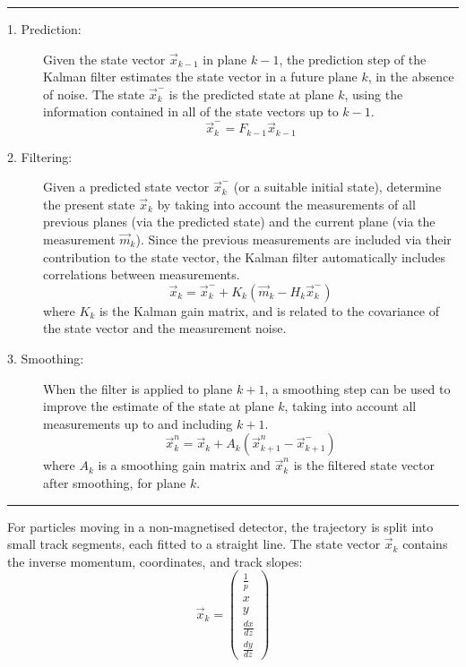 \vspace{1em}\hrule\vspace{1em}
\begin{description}
    \item[1. Prediction:] Given the state vector $\vec{x}_{k-1}$ in plane $k-1$, the prediction step of the Kalman filter estimates the state vector in a future plane $k$, in the absence of noise. The state $\vec{x}_k^{-}$ is the predicted state at plane $k$, using the information contained in all of the state vectors up to $k-1$.
    \begin{equation}\label{eqn:kalman_prediction_step}
        \vec{x}_k^{-} = F_{k-1} \vec{x}_{k-1}
    \end{equation}

    \item[2. Filtering:] Given a predicted state vector $\vec{x}_k^{-}$ (or a suitable initial state), determine the present state $\vec{x}_k$ by taking into account the measurements of all previous planes (via the predicted state) and the current plane (via the measurement $\vec{m}_k$). Since the previous measurements are included via their contribution to the state vector, the Kalman filter automatically includes correlations between measurements.
    \begin{equation}\label{eqn:kalman_filtering_step}
        \vec{x}_k = \vec{x}_k^{-} + K_k \left(\vec{m}_k - H_k\vec{x}_k^{-} \right)
    \end{equation}
    where $K_k$ is the Kalman gain matrix, and is related to the covariance of the state vector and the measurement noise.

    \item[3. Smoothing:] When the filter is applied to plane $k+1$, a smoothing step can be used to improve the estimate of the state at plane $k$, taking into account all measurements up to and including $k+1$.
    \begin{equation}
        \vec{x}_k^{n} = \vec{x}_k + A_k \left(\vec{x}_{k+1}^n - \vec{x}_{k+1}^{-}\right)
    \end{equation}
    where $A_k$ is a smoothing gain matrix and $\vec{x}_k^n$ is the filtered state vector after smoothing, for plane $k$.
\end{description}
\vspace{1em}\hrule\vspace{1em}

For particles moving in a non-magnetised detector, the trajectory is split into small track segments, each fitted to a straight line. The state vector $\vec{x}_k$ contains the inverse momentum, coordinates, and track slopes:
\begin{equation}\label{eqn:kalman_state_vector}
    \vec{x}_k = \left( \begin{array}{c} \frac{1}{p} \\ x \\ y \\ \frac{dx}{dz} \\ \frac{dy}{dz} \end{array} \right)
\end{equation}

